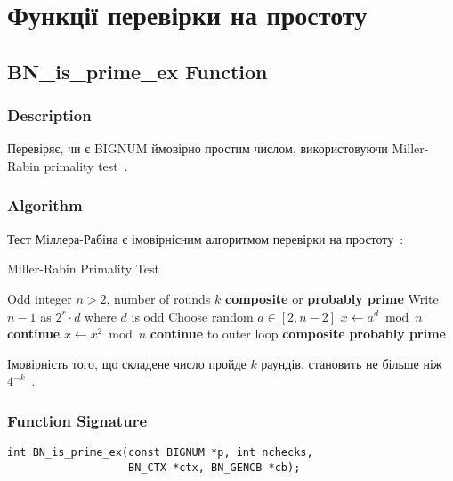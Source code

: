 \section{Функції перевірки на простоту}

\subsection{BN\_is\_prime\_ex Function}

\subsubsection{Description}
Перевіряє, чи є BIGNUM ймовірно простим числом, використовуючи Miller-Rabin primality test~\cite{rabin1980probabilistic, menezes1996handbook}.

\subsubsection{Algorithm}
Тест Міллера-Рабіна є імовірнісним алгоритмом перевірки на простоту~\cite{miller1976riemann}:

\begin{algorithm}
    \caption{Miller-Rabin Primality Test}
    \begin{algorithmic}[1]
        \Require Odd integer $n > 2$, number of rounds $k$
        \Ensure \textbf{composite} or \textbf{probably prime}
        \State Write $n-1$ as $2^r \cdot d$ where $d$ is odd
        \State Choose random $a \in [2, n-2]$
        \State $x \gets a^d \bmod n$
        \State \textbf{continue}
        \EndIf
        \State $x \gets x^2 \bmod n$
        \State \textbf{continue} to outer loop
        \EndIf
        \EndFor
        \State \Return \textbf{composite}
        \EndFor
        \State \Return \textbf{probably prime}
    \end{algorithmic}
\end{algorithm}

Імовірність того, що складене число пройде $k$ раундів, становить не більше ніж $4^{-k}$~\cite{rabin1980probabilistic}.

\subsubsection{Function Signature}
\begin{verbatim}
int BN_is_prime_ex(const BIGNUM *p, int nchecks, 
                   BN_CTX *ctx, BN_GENCB *cb);
\end{verbatim}

